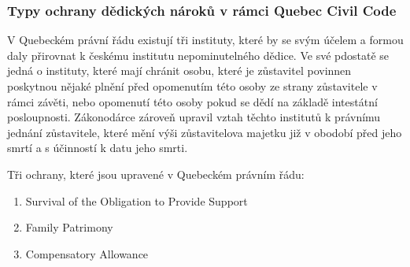 \documentclass{article}
\begin{document}





\subsubsection{Typy ochrany dědických nároků v rámci Quebec Civil Code}

V Quebeckém právní řádu existují tři instituty, které by se svým účelem a formou daly přirovnat k českému institutu nepominutelného dědice. Ve své pdostatě se jedná o instituty, které mají chránit osobu, které je zůstavitel povinnen poskytnou nějaké plnění před opomenutím této osoby ze strany zůstavitele v rámci závěti, nebo opomenutí této osoby pokud se dědí na základě intestátní posloupnosti. Zákonodárce zároveň upravil vztah těchto institutů k právnímu jednání zůstavitele, které mění výši zůstavitelova majetku již v obodobí před jeho smrtí a s účinností k datu jeho smrti. \\

\vspace{5 mm}

Tři ochrany, které jsou upravené v Quebeckém právním řádu:

\begin{enumerate}
\item Survival of the Obligation to Provide Support
\item Family Patrimony
\item Compensatory Allowance	
\end{enumerate}
\end{document}
